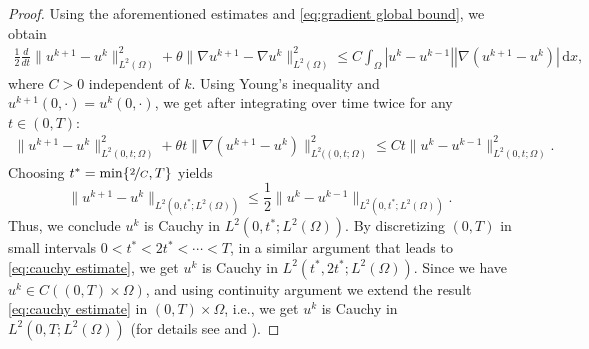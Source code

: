 \documentclass[11pt]{article}
\newcommand{\di}[1]{\,\mathrm{d}#1}
\begin{document}
\begin{proof}
Using the aforementioned estimates and \eqref{eq:gradient global bound}, we obtain
 \begin{align}
      \frac{1}{2}\frac{d}{dt} \|u^{k+1}-u^{k}\|_{L^2(\Omega)}^2+\theta \|\nabla u^{k+1}-\nabla u^{k}\|_{L^2(\Omega)}^2 \leq C\int_{\Omega} |u^k-u^{k-1}| |\nabla (u^{k+1}-u^{k})| \di{x},
 \end{align}
 where $C>0$ independent of $k$.
 Using Young's inequality and $u^{k+1}(0,\cdot)=u^k(0,\cdot)$, we get after integrating over time twice for any $t\in(0,T)$: 
\begin{align}
      \|u^{k+1}-u^{k}\|_{L^2(0,t;\Omega)}^2+\theta t \|\nabla(u^{k+1}-u^{k})\|_{L^2((0,t;\Omega)}^2 \leq Ct\|u^k-u^{k-1}\|_{L^2(0,t;\Omega)}^2.\label{eq:timeder of uk+1-uk}
 \end{align}
 Choosing $t^*=\min\{\nicefrac{2}{C},T\}$ yields
 \begin{equation}\label{eq:cauchy estimate}
     \|u^{k+1}-u^{k}\|_{L^2(0,t^*;L^2(\Omega))}\leq \frac{1}{2} \|u^{k}-u^{k-1}\|_{L^2(0,t^*;L^2(\Omega))}.
 \end{equation}
 Thus, we conclude $u^{k}$ is Cauchy in $L^2(0,t^*;L^2(\Omega))$.
 By discretizing $(0,T)$ in small intervals $0<t^*<2t^*<\cdots<T$, in a similar argument that leads to \eqref{eq:cauchy estimate}, we get $u^{k}$ is Cauchy in $L^2(t^*,2t^*;L^2(\Omega))$. Since we have $u^k\in C((0,T)\times \Omega)$,
 and using continuity argument we extend the result \eqref{eq:cauchy estimate} in $(0,T)\times \Omega$, i.e., we get $u^{k}$ is Cauchy in $L^2(0,T;L^2(\Omega))$ (for details see \cite[Remark in Section 2]{lyons2023phase} and \cite[Section 7]{amann2011ordinary} ). 
 \end{proof}
\end{document}
